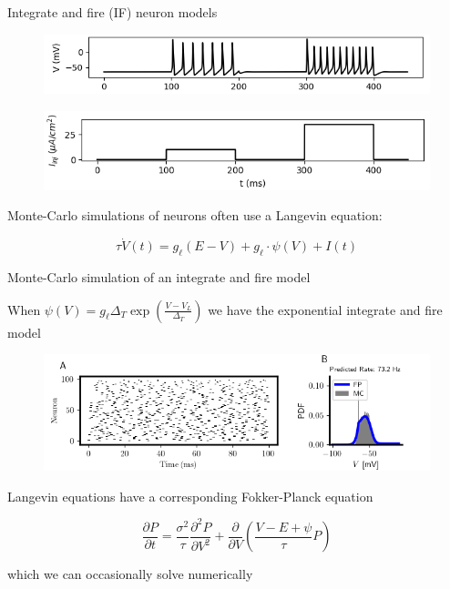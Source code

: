\documentclass[aspectratio=169]{beamer}
\begin{document}
\begin{frame}{Integrate and fire (IF) neuron models}

\begin{figure}
\centering
\includegraphics[width=140mm]{figure-19-1}
\end{figure}

\begin{figure}
\centering
\includegraphics[width=140mm]{figure-19-2}
\end{figure}

Monte-Carlo simulations of neurons often use a Langevin equation:

\begin{equation*}
\tau\dot{V}(t) = g_{\ell}(E - V) + g_{\ell}\cdot \psi(V) + I(t)
\end{equation*}


\end{frame}

\begin{frame}{Monte-Carlo simulation of an integrate and fire model}

When $\psi(V) = g_{\ell}\Delta_{T}\exp\left(\frac{V-V_{L}}{\Delta_{T}}\right)$ we have the exponential integrate and fire model

\begin{figure}
\centering
\includegraphics[width=140mm]{figure-3-1}
\end{figure}

Langevin equations have a corresponding Fokker-Planck equation 

\begin{equation*}
\frac{\partial P}{\partial t} = \frac{\sigma^{2}}{\tau}\frac{\partial^{2}P}{\partial V^{2}} + \frac{\partial}{\partial V}\left(\frac{V-E+\psi}{\tau}P\right)
\end{equation*}

which we can occasionally solve numerically

\end{frame}
\end{document}
